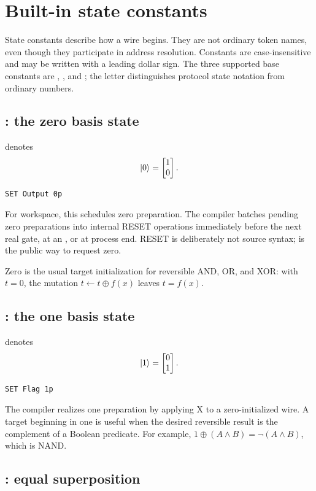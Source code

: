 \section{Built-in state constants}

State constants describe how a wire begins. They are not ordinary token names,
even though they participate in address resolution. Constants are
case-insensitive and may be written with a leading dollar sign. The three
supported base constants are , , and ; the letter
 distinguishes protocol state notation from ordinary numbers.

\subsection{: the zero basis state}

 denotes
\[
\lvert 0\rangle=\begin{bmatrix}1\\0\end{bmatrix}.
\]
\begin{lstlisting}
SET Output 0p
\end{lstlisting}
For workspace, this schedules zero preparation. The compiler batches pending
zero preparations into internal RESET operations immediately before the next
real gate, at an , or at process end. RESET is deliberately
not source syntax;  is the public way to request zero.

Zero is the usual target initialization for reversible AND, OR, and XOR:
with $t=0$, the mutation $t\leftarrow t\oplus f(x)$ leaves $t=f(x)$.

\subsection{: the one basis state}

 denotes
\[
\lvert 1\rangle=\begin{bmatrix}0\\1\end{bmatrix}.
\]
\begin{lstlisting}
SET Flag 1p
\end{lstlisting}
The compiler realizes one preparation by applying X to a zero-initialized
wire. A target beginning in one is useful when the desired reversible result is
the complement of a Boolean predicate. For example,
$1\oplus(A\land B)=\neg(A\land B)$, which is NAND.

\subsection{: equal superposition}


